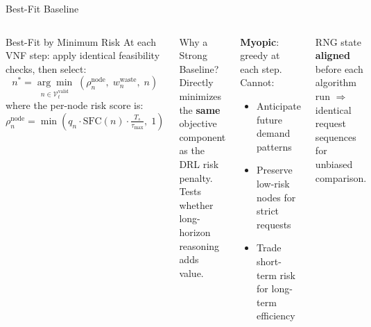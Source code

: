 \begin{frame}{Best-Fit Baseline}
  \begin{columns}[T]
      \begin{block}{Best-Fit by Minimum Risk}
        At each VNF step: apply identical feasibility checks, then select:
        \[n^* = \underset{n \in \mathcal{V}_t^{\text{valid}}}{\arg\min}\;\left(\rho_n^{\text{node}},\; w_n^{\text{waste}},\; n\right)\]
        where the per-node risk score is:
        \[\rho_n^{\text{node}} = \min\!\left(q_n \cdot \mathrm{SFC}(n) \cdot \tfrac{T_s}{\tau_{\max}},\;1\right)\]
      \end{block}
      \vspace{4pt}
      \begin{block}{Why a Strong Baseline?}
        Directly minimizes the \textbf{same} objective component as the DRL risk penalty. Tests whether long-horizon reasoning adds value.
      \end{block}
      \begin{tcolorbox}[colback=lightgray, colframe=warningorange, title=Baseline Limitation, fonttitle=\small\bfseries]
        \footnotesize
        \textbf{Myopic}: greedy at each step. Cannot:
        \begin{itemize}
          \item Anticipate future demand patterns
          \item Preserve low-risk nodes for strict requests
          \item Trade short-term risk for long-term efficiency
        \end{itemize}
      \end{tcolorbox}
      \vspace{4pt}
      \begin{tcolorbox}[colback=lightgray, colframe=successgreen, title=Fair Evaluation, fonttitle=\small\bfseries]
        \footnotesize
        RNG state \textbf{aligned} before each algorithm run $\Rightarrow$ identical request sequences for unbiased comparison.
      \end{tcolorbox}
  \end{columns}
\end{frame}
